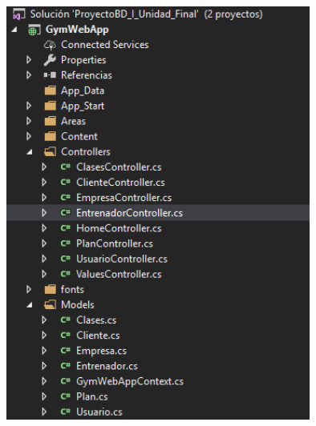              \begin{center}
			\includegraphics[width=10cm]{./Imagenes/1}
             \end{center}
